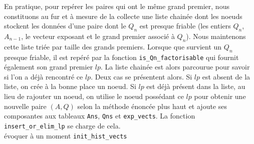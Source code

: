 En pratique, pour repérer les paires qui ont le même grand premier, nous
constituons au fur et à mesure de la collecte une liste chainée dont les noeuds
stockent les données d'une paire dont le $Q_n$ est presque friable (les entiers
$Q_n$, $A_{n-1}$, le vecteur exposant et le grand premier associé à $Q_n$). Nous
maintenons cette liste triée par taille des grands premiers. Lorsque que survient
un $Q_n$ presque friable, il est repéré par la fonction
\texttt{is\_Qn\_factorisable} qui fournit également son grand premier $lp$. La 
liste chainée est alors parcourue pour savoir si l'on a déjà rencontré ce $lp$.
Deux cas se présentent alors. Si $lp$ est absent de la liste, on crée à la bonne
place un noeud. Si $lp$ est déjà présent dans la liste, au lieu de rajouter un
noeud, on utilise le noeud possédant ce $lp$ pour obtenir une nouvelle paire
$(A,Q)$ selon la méthode énoncée plus haut et ajoute ses composantes aux tableaux
\texttt{Ans}, \texttt{Qns} et \texttt{exp\_vects}. La fonction
\texttt{insert\_or\_elim\_lp} se charge de cela. \\

évoquer à un moment \texttt{init\_hist\_vects}\\  
